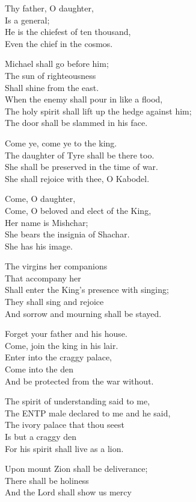\documentclass[
]{book}
\begin{document}
Thy father, O daughter,\\
Is a general;\\
He is the chiefest of ten thousand,\\
Even the chief in the cosmos.

Michael shall go before him;\\
The sun of righteousness\\
Shall shine from the east.\\
When the enemy shall pour in like a flood,\\
The holy spirit shall lift up the hedge against him;\\
The door shall be slammed in his face.

Come ye, come ye to the king.\\
The daughter of Tyre shall be there too.\\
She shall be preserved in the time of war.\\
She shall rejoice with thee, O Kabodel.

Come, O daughter,\\
Come, O beloved and elect of the King,\\
Her name is Mishchar;\\
She bears the insignia of Shachar.\\
She has his image.

The virgins her companions\\
That accompany her\\
Shall enter the King's presence with singing;\\
They shall sing and rejoice\\
And sorrow and mourning shall be stayed.

Forget your father and his house.\\
Come, join the king in his lair.\\
Enter into the craggy palace,\\
Come into the den\\
And be protected from the war without.

The spirit of understanding said to me,\\
The ENTP male declared to me and he said,\\
The ivory palace that thou seest\\
Is but a craggy den\\
For his spirit shall live as a lion.

Upon mount Zion shall be deliverance;\\
There shall be holiness\\
And the Lord shall show us mercy
\end{document}
